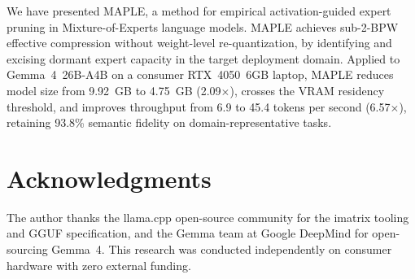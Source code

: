 \documentclass[final]{article}
\newcommand{\MAPLE}{\textsc{MAPLE}}
\begin{document}
We have presented \MAPLE{}, a method for empirical activation-guided expert pruning in Mixture-of-Experts language models. \MAPLE{} achieves sub-2-BPW effective compression without weight-level re-quantization, by identifying and excising dormant expert capacity in the target deployment domain. Applied to Gemma~4~26B-A4B on a consumer RTX~4050~6GB laptop, \MAPLE{} reduces model size from 9.92~GB to 4.75~GB (2.09$\times$), crosses the VRAM residency threshold, and improves throughput from 6.9 to 45.4 tokens per second (6.57$\times$), retaining 93.8\% semantic fidelity on domain-representative tasks.

\section*{Acknowledgments}

The author thanks the llama.cpp open-source community for the imatrix tooling and GGUF specification, and the Gemma team at Google DeepMind for open-sourcing Gemma~4. This research was conducted independently on consumer hardware with zero external funding.
\end{document}
